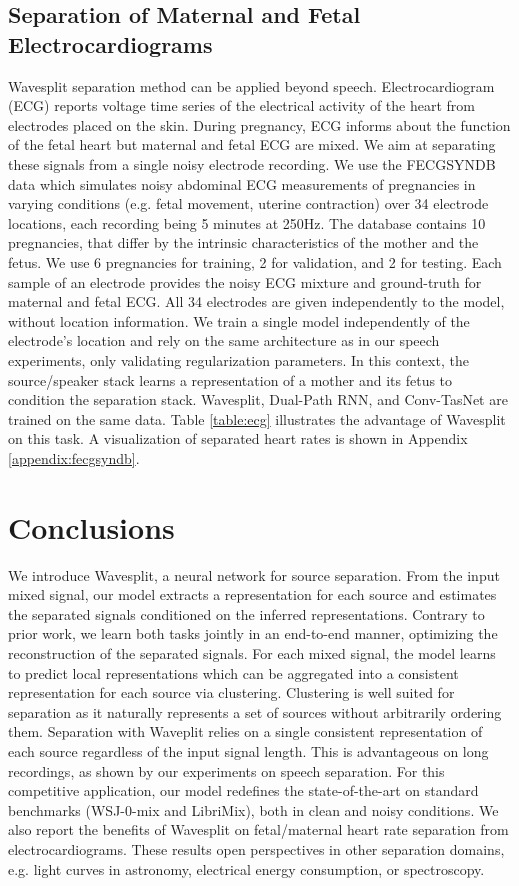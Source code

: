 \documentclass[letterpaper, onecolumn,10 pt]{IEEEtran}
\begin{document}
\subsection{Separation of Maternal and Fetal Electrocardiograms}

Wavesplit separation method can be applied beyond speech. Electrocardiogram (ECG) reports voltage time series of the electrical activity of the heart from electrodes placed on the skin. During pregnancy, ECG informs about the function of the fetal heart but maternal and fetal ECG are mixed. We aim at separating these signals from a single noisy electrode recording. We use the FECGSYNDB data \cite{andreotti2016open} which simulates noisy abdominal ECG measurements of pregnancies in varying conditions (e.g. fetal movement, uterine contraction) over 34 electrode locations, each recording being 5 minutes at 250Hz. The database contains 10 pregnancies, that differ by the intrinsic characteristics of the mother and the fetus. We use 6 pregnancies for training, 2 for validation, and 2 for testing. Each sample of an electrode provides the noisy ECG mixture and ground-truth for maternal and fetal ECG. All 34 electrodes are given independently to the model, without location information. We train a single model independently of the electrode's location and rely on the same architecture as in our speech experiments, only validating regularization parameters. In this context, the source/speaker stack learns a representation of a mother and its fetus to condition the separation stack. Wavesplit, Dual-Path RNN, and Conv-TasNet are trained on the same data. Table \ref{table:ecg} illustrates the advantage of Wavesplit on this task. A visualization of separated heart rates is shown in Appendix \ref{appendix:fecgsyndb}.

\section{Conclusions}
\label{sec:ccl}

We introduce Wavesplit, a neural network for source separation. From the input mixed signal, our model extracts a representation for each source and estimates the separated signals conditioned on the inferred representations. Contrary to prior work, we learn both tasks jointly in an end-to-end manner, optimizing the reconstruction of the separated signals. For each mixed signal, the model learns to predict local representations which can be aggregated into a consistent representation for each source via clustering. Clustering is well suited for separation as it naturally represents a set of sources without arbitrarily ordering them. Separation with Waveplit relies on a single consistent representation of each source regardless of the input signal length. This is advantageous on long recordings, as shown by our experiments on speech separation. For this competitive application, our model redefines the state-of-the-art on standard benchmarks (WSJ-0-mix and LibriMix), both in clean and noisy conditions. We also report the benefits of Wavesplit on fetal/maternal heart rate separation from electrocardiograms. These results open perspectives in other separation domains, e.g. light curves in astronomy, electrical energy consumption, or spectroscopy.
\end{document}
